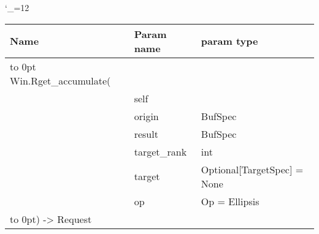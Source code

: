 \begingroup \catcode`\_=12 \tt
\begin{tabular}{lll}
\toprule
\textrm{Name}&\textrm{Param name}&\textrm{param type}\\
\midrule
\hbox to 0pt {Win.Rget_accumulate(\hss}\\
& self\\
& origin & BufSpec\\
& result & BufSpec\\
& target_rank & int\\
& target & Optional[TargetSpec] = None\\
& op & Op = Ellipsis\\
\hbox to 0pt{) -> Request\hss}\\
\bottomrule
\end{tabular}
\endgroup
